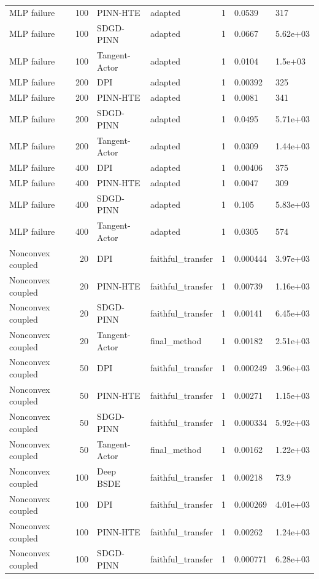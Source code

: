 \begin{tabular}{lrllrll}
MLP failure & 100 & PINN-HTE & adapted & 1 & 0.0539 & 317 \\
MLP failure & 100 & SDGD-PINN & adapted & 1 & 0.0667 & 5.62e+03 \\
MLP failure & 100 & Tangent-Actor & adapted & 1 & 0.0104 & 1.5e+03 \\
MLP failure & 200 & DPI & adapted & 1 & 0.00392 & 325 \\
MLP failure & 200 & PINN-HTE & adapted & 1 & 0.0081 & 341 \\
MLP failure & 200 & SDGD-PINN & adapted & 1 & 0.0495 & 5.71e+03 \\
MLP failure & 200 & Tangent-Actor & adapted & 1 & 0.0309 & 1.44e+03 \\
MLP failure & 400 & DPI & adapted & 1 & 0.00406 & 375 \\
MLP failure & 400 & PINN-HTE & adapted & 1 & 0.0047 & 309 \\
MLP failure & 400 & SDGD-PINN & adapted & 1 & 0.105 & 5.83e+03 \\
MLP failure & 400 & Tangent-Actor & adapted & 1 & 0.0305 & 574 \\
Nonconvex coupled & 20 & DPI & faithful\_transfer & 1 & 0.000444 & 3.97e+03 \\
Nonconvex coupled & 20 & PINN-HTE & faithful\_transfer & 1 & 0.00739 & 1.16e+03 \\
Nonconvex coupled & 20 & SDGD-PINN & faithful\_transfer & 1 & 0.00141 & 6.45e+03 \\
Nonconvex coupled & 20 & Tangent-Actor & final\_method & 1 & 0.00182 & 2.51e+03 \\
Nonconvex coupled & 50 & DPI & faithful\_transfer & 1 & 0.000249 & 3.96e+03 \\
Nonconvex coupled & 50 & PINN-HTE & faithful\_transfer & 1 & 0.00271 & 1.15e+03 \\
Nonconvex coupled & 50 & SDGD-PINN & faithful\_transfer & 1 & 0.000334 & 5.92e+03 \\
Nonconvex coupled & 50 & Tangent-Actor & final\_method & 1 & 0.00162 & 1.22e+03 \\
Nonconvex coupled & 100 & Deep BSDE & faithful\_transfer & 1 & 0.00218 & 73.9 \\
Nonconvex coupled & 100 & DPI & faithful\_transfer & 1 & 0.000269 & 4.01e+03 \\
Nonconvex coupled & 100 & PINN-HTE & faithful\_transfer & 1 & 0.00262 & 1.24e+03 \\
Nonconvex coupled & 100 & SDGD-PINN & faithful\_transfer & 1 & 0.000771 & 6.28e+03 \\

\end{tabular}
